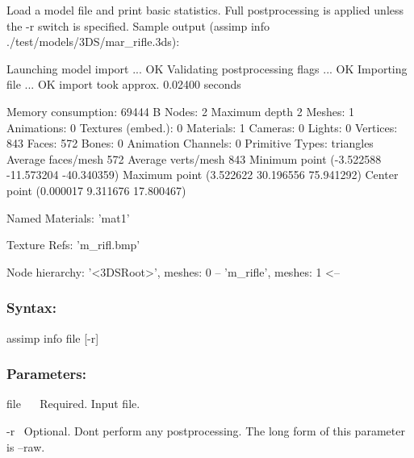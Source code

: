 Load a model file and print basic statistics. Full postprocessing is applied unless the {\ttfamily -\/r} switch is specified. Sample output ({\ttfamily assimp info ./test/models/3\+D\+S/mar\+\_\+rifle.3ds})\+:

\begin{DoxyVerb}Launching model import ...           OK
Validating postprocessing flags ...  OK
Importing file ...                   OK
   import took approx. 0.02400 seconds

Memory consumption: 69444 B
Nodes:              2
Maximum depth       2
Meshes:             1
Animations:         0
Textures (embed.):  0
Materials:          1
Cameras:            0
Lights:             0
Vertices:           843
Faces:              572
Bones:              0
Animation Channels: 0
Primitive Types:    triangles
Average faces/mesh  572
Average verts/mesh  843
Minimum point      (-3.522588 -11.573204 -40.340359)
Maximum point      (3.522622 30.196556 75.941292)
Center point       (0.000017 9.311676 17.800467)

Named Materials:
    'mat1'

Texture Refs:
    'm_rifl.bmp'

Node hierarchy:
'<3DSRoot>', meshes: 0
-- 'm_rifle', meshes: 1
<--
\end{DoxyVerb}


\subsubsection*{Syntax\+:}


\begin{DoxyCode}
assimp info file [-r]
\end{DoxyCode}


\subsubsection*{Parameters\+:}

{\ttfamily  file~\newline
}~\newline
 Required. Input file. 

{\ttfamily  -\/r}~\newline
 Optional. Don\textquotesingle{}t perform any postprocessing. The long form of this parameter is {\ttfamily --raw}. 